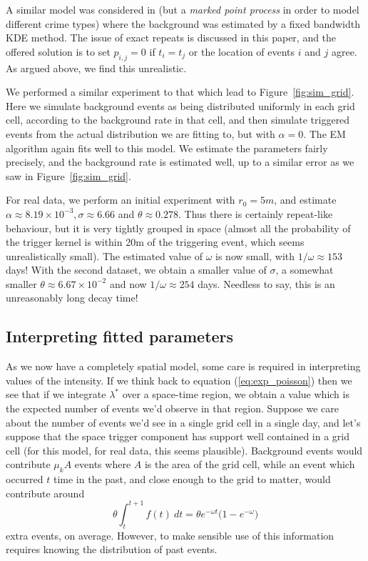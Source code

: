 \documentclass[twoside,a4paper]{article}
\theoremstyle{plain}
\theoremstyle{definition}
\begin{document}
A similar model was considered in \cite{mohler} (but a \emph{marked point process} in order
to model different crime types) where the background was estimated by a fixed bandwidth KDE
method.  The issue of exact repeats is discussed in this paper, and the offered solution is
to set $p_{i,j}=0$ if $t_i=t_j$ or the location of events $i$ and $j$ agree.  As argued above,
we find this unrealistic.

We performed a similar experiment to that which lead to Figure~\ref{fig:sim_grid}.  Here we
simulate background events as being distributed uniformly in each grid cell, according to
the background rate in that cell, and then simulate triggered events from the actual distribution
we are fitting to, but with $\alpha=0$.  The EM algorithm again fits well to this model.
We estimate the parameters fairly precisely, and the background rate is estimated well,
up to a similar error as we saw in Figure~\ref{fig:sim_grid}.

For real data, we perform an initial
experiment with $r_0=5m$, and estimate $\alpha\approx 8.19\times 10^{-3}, \sigma \approx 6.66$
and $\theta\approx 0.278$.  Thus there is certainly repeat-like behaviour, but it is very
tightly grouped in space (almost all the probability of the trigger kernel is within
20m of the triggering event, which seems unrealistically small).  The estimated value of
$\omega$ is now small, with $1/\omega \approx 153$ days!  With the second dataset, we obtain
a smaller value of $\sigma$, a somewhat smaller $\theta \approx 6.67\times 10^{-2}$ and
now $1/\omega\approx 254$ days.  Needless to say, this is an unreasonably long decay time!




\subsection{Interpreting fitted parameters}\label{sec:int_fit_params}

As we now have a completely spatial model, some care is required in interpreting values of
the intensity.  If we think back to equation (\ref{eq:exp_poisson}) then we see that if
we integrate $\lambda^*$ over a space-time region, we obtain a value which is the expected
number of events we'd observe in that region.  Suppose we care about the number of events
we'd see in a single grid cell in a single day, and let's suppose that the space trigger
component has support well contained in a grid cell (for this model, for real data, this
seems plausible).  Background events would contribute $\mu_k A$ events where $A$ is the
area of the grid cell, while an event which occurred $t$ time in the past, and close enough
to the grid to matter, would contribute around
\[ \theta \int_{t}^{t+1} f(t) \ dt = \theta e^{-\omega t} \big( 1 - e^{-\omega} \big) \]
extra events, on average.  However, to make sensible use of this information requires knowing
the distribution of past events.
\end{document}
